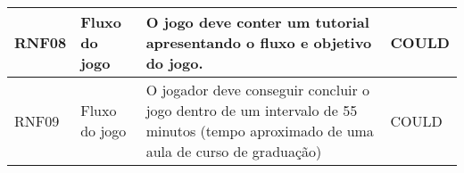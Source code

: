\begin{table}[htbp]
\begin{tabular}{|p{1.3cm}|p{2.7cm}|p{8cm}|p{2.1cm}|}
\textcolor{textmodified}{ RNF08} & \textcolor{textmodified}{Fluxo do jogo}                & \textcolor{textmodified}{O jogo deve conter um tutorial apresentando o fluxo e objetivo do jogo.} & \textcolor{textadded}{COULD} \\ \hline

RNF09 & \textcolor{textmodified}{Fluxo do jogo}             & \textcolor{textmodified}{O jogador deve conseguir concluir o jogo dentro de um intervalo de 55 minutos (tempo aproximado de uma aula de curso de graduação)} & \textcolor{textadded}{COULD}    \\ \hline

\end{tabular}
\end{table}